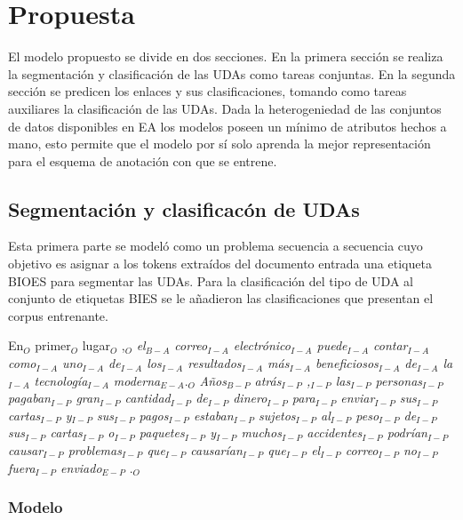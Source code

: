 \chapter{Propuesta}\label{chapter:proposal}

El modelo propuesto se divide en dos secciones. En la primera sección se realiza la segmentación y clasificación de 
las UDAs como tareas conjuntas. En la segunda sección se predicen los enlaces y sus clasificaciones, tomando
como tareas auxiliares la clasificación de las UDAs. Dada la heterogeniedad de las conjuntos de datos disponibles 
en EA los modelos poseen un mínimo de atributos hechos a mano, esto permite que el modelo por sí solo aprenda 
la mejor representación para el esquema de anotación con que se entrene.

\section{Segmentación y clasificacón de UDAs}

Esta primera parte se modeló como un problema secuencia a secuencia cuyo objetivo es asignar a los tokens 
extraídos del documento entrada una etiqueta BIOES para segmentar las UDAs. Para la clasificación del tipo 
de UDA al conjunto de etiquetas BIES se le añadieron las clasificaciones que presentan el corpus entrenante.

\begin{adjustwidth}{25pt}{25pt}
    En$_O$ primer$_O$ lugar$_O$ ,$_O$ \emph{el$_{B-A}$ correo$_{I-A}$ electrónico$_{I-A}$ puede$_{I-A}$ 
    contar$_{I-A}$ como$_{I-A}$ uno$_{I-A}$ de$_{I-A}$ los$_{I-A}$ resultados$_{I-A}$
    más$_{I-A}$ beneficiosos$_{I-A}$ de$_{I-A}$ la$_{I-A}$ tecnología$_{I-A}$ moderna$_{E-A}$}.$_{O}$ 
    \emph{Años$_{B-P}$ atrás$_{I-P}$ ,$_{I-P}$ las$_{I-P}$ personas$_{I-P}$ pagaban$_{I-P}$ gran$_{I-P}$ cantidad$_{I-P}$ 
    de$_{I-P}$ dinero$_{I-P}$ para$_{I-P}$ enviar$_{I-P}$ sus$_{I-P}$ cartas$_{I-P}$ y$_{I-P}$ sus$_{I-P}$ 
    pagos$_{I-P}$ estaban$_{I-P}$ sujetos$_{I-P}$ al$_{I-P}$ peso$_{I-P}$ de$_{I-P}$ sus$_{I-P}$ 
    cartas$_{I-P}$ o$_{I-P}$ paquetes$_{I-P}$ y$_{I-P}$ muchos$_{I-P}$ accidentes$_{I-P}$ podrían$_{I-P}$
    causar$_{I-P}$ problemas$_{I-P}$ que$_{I-P}$ causarían$_{I-P}$ que$_{I-P}$ el$_{I-P}$ correo$_{I-P}$ 
    no$_{I-P}$ fuera$_{I-P}$ enviado$_{E-P}$} .$_{O}$
\end{adjustwidth}

\subsection{Modelo}

